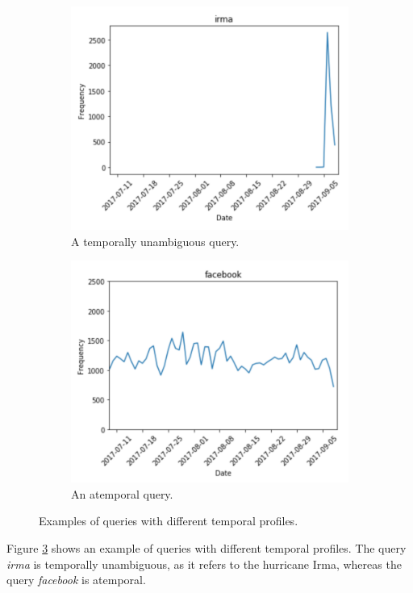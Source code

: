 \begin{figure}
\centering
\begin{subfigure}{.5\textwidth}
  \centering
  \includegraphics[width=.8\linewidth]{img/query1.png}
  \caption{A temporally unambiguous query.}
  \label{fig:query1}
\end{subfigure}%
\begin{subfigure}{.5\textwidth}
  \centering
  \includegraphics[width=.8\linewidth]{img/query2.png}
  \caption{An atemporal query.}
  \label{fig:query2}
\end{subfigure}
\caption{Examples of queries with different temporal profiles.}
\label{fig:query-temporal}
\end{figure}

Figure \ref{fig:query-temporal} shows an example of queries with different temporal profiles. The query \textit{irma} is temporally unambiguous, as it refers to the hurricane Irma, whereas the query \textit{facebook} is atemporal.

